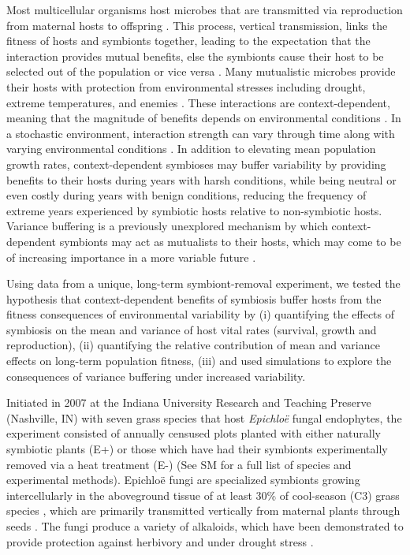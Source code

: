 \documentclass[12pt]{article}
\begin{document}
Most multicellular organisms host microbes that are transmitted via reproduction from maternal hosts to offspring \cite{funkhouser2013mom}.
This process, vertical transmission, links the fitness of hosts and symbionts together, leading to the expectation that the interaction provides mutual benefits, else the symbionts cause their host to be selected out of the population or vice versa \cite{ewald1987transmission,fine1975vectors}. 
Many mutualistic microbes provide their hosts with protection from environmental stresses including drought, extreme temperatures, and enemies \cite{russell2006costs,brownlie2009symbiont,kivlin2013fungal,corbin2017heritable,hoadley2019host}. 
These interactions are context-dependent, meaning that the magnitude of benefits depends on environmental conditions \cite{chamberlain2014context}. 
In a stochastic environment, interaction strength can vary through time along with varying environmental conditions \cite{jordano1994spatial,billick2003relative}. 
In addition to elevating mean population growth rates, context-dependent symbioses may buffer variability by providing benefits to their hosts during years with harsh conditions, while being neutral or even costly during years with benign conditions, reducing the frequency of extreme years experienced by symbiotic hosts relative to non-symbiotic hosts. 
Variance buffering is a previously unexplored mechanism by which context-dependent symbionts may act as mutualists to their hosts, which may come to be of increasing importance in a more variable future \cite{rudgers2020climate}.

Using data from a unique, long-term symbiont-removal experiment, we tested the hypothesis that context-dependent benefits of symbiosis buffer hosts from the fitness consequences of environmental variability by (i) quantifying the effects of symbiosis on the mean and variance of host vital rates (survival, growth and reproduction), (ii) quantifying the relative contribution of mean and variance effects on long-term population fitness, (iii) and used simulations to explore the consequences of variance buffering under increased variability.

Initiated in 2007 at the Indiana University Research and Teaching Preserve (Nashville, IN) with seven grass species that host \emph{Epichlo\"{e}} fungal endophytes, the experiment consisted of annually censused plots planted with either naturally symbiotic plants (E+) or those which have had their symbionts experimentally removed  via a heat treatment (E-) (See SM for a full list of species and experimental methods).
Epichlo\"{e} fungi are specialized symbionts growing intercellularly in the aboveground tissue of at least 30\% of cool-season (C3) grass species \cite{leuchtmann1992systematics}, which are primarily transmitted vertically from maternal plants through seeds \cite{cheplick2009ecology,rudgers2009fungus}.
The fungi produce a variety of alkaloids, which have been demonstrated to provide protection against herbivory \cite{brem2001epichloe} and under drought stress \cite{cheplick2004recovery,kannadan2008endophyte,decunta2021systematic}.
\end{document}
